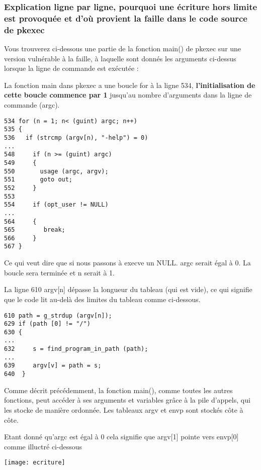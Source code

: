 \documentclass[12pt,a4paper]{article}
\begin{document}
\begin{flushleft}
            \subsubsection{Explication ligne par ligne, pourquoi une écriture hors limite est provoquée et d'où provient la faille dans le code source de pkexec}
                \item  Vous trouverez ci-dessous une partie de la fonction main() de pkexec sur une version vulnérable à la faille, à laquelle sont donnés les arguments ci-dessus lorsque la ligne de commande est exécutée :
                \item La fonction main{} dans pkexec a une boucle for à la ligne 534, \textbf{l'initialisation de cette boucle commence par 1} jusqu'au nombre d'arguments dans la ligne de commande (argc).
                \begin{lstlisting}
534 for (n = 1; n< (guint) argc; n++)
535 {
536   if (strcmp (argv[n), "-help") = 0)
...
548     if (n >= (guint) argc)
549     {
550       usage (argc, argv);  
551       goto out;
552     }
553
554     if (opt_user != NULL)
...
564     {
565        break;
566     }
567 }
                \end{lstlisting}
                \item Ce qui veut dire que si nous passons à execve un NULL. argc serait égal à 0. La boucle sera terminée et n serait à 1.
                \item La ligne 610 argv[n] dépasse la longueur du tableau (qui est vide), ce qui signifie que le code lit au-delà des limites du tableau comme ci-dessous.
                \begin{lstlisting}
610 path = g_strdup (argv[n]);
629 if (path [0] != "/")
630 {
...
632     s = find_program_in_path (path);
...
639     argv[v] = path = s;
640  }
                \end{lstlisting}
                \item Comme décrit précédemment, la fonction main(), comme toutes les autres fonctions, peut accéder à ses arguments et variables grâce à la pile d’appels, qui les stocke de manière ordonnée. Les tableaux argv et envp sont stockés côte à côte.
                \item  Etant donné qu'argc est égal à 0 cela signifie que argv[1] pointe vers envp[0] comme illuctré ci-dessous
                \begin{center}
                    \texttt{[image: ecriture]}
                \end{center}

\end{flushleft}
\end{document}
